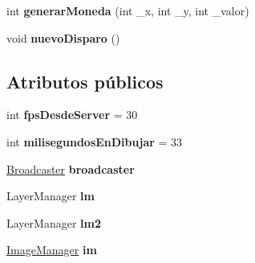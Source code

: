 \begin{DoxyCompactItemize}
\item 
\hypertarget{classBatallaEspacial_1_1Juego_af03e6beac3e3f78e21d41c43a7137296}{
int {\bfseries generarMoneda} (int \_\-x, int \_\-y, int \_\-valor)}
\label{classBatallaEspacial_1_1Juego_af03e6beac3e3f78e21d41c43a7137296}

\item 
\hypertarget{classBatallaEspacial_1_1Juego_ab76f9af23024a4f491d0dc5ec602e8a8}{
void {\bfseries nuevoDisparo} ()}
\label{classBatallaEspacial_1_1Juego_ab76f9af23024a4f491d0dc5ec602e8a8}

\end{DoxyCompactItemize}
\subsection*{Atributos públicos}
\begin{DoxyCompactItemize}
\item 
\hypertarget{classBatallaEspacial_1_1Juego_a377182d34c0423e8f8bf97665bee633f}{
int {\bfseries fpsDesdeServer} = 30}
\label{classBatallaEspacial_1_1Juego_a377182d34c0423e8f8bf97665bee633f}

\item 
\hypertarget{classBatallaEspacial_1_1Juego_a959e754024af44ba431b8f408efc74ef}{
int {\bfseries milisegundosEnDibujar} = 33}
\label{classBatallaEspacial_1_1Juego_a959e754024af44ba431b8f408efc74ef}

\item 
\hypertarget{classBatallaEspacial_1_1Juego_acda7dab731efc8f0d126269ae6edd70e}{
\hyperlink{classBatallaEspacial_1_1Broadcaster}{Broadcaster} {\bfseries broadcaster}}
\label{classBatallaEspacial_1_1Juego_acda7dab731efc8f0d126269ae6edd70e}

\item 
\hypertarget{classBatallaEspacial_1_1Juego_a8ba5b0744fdd2a71aa22b2930a3bd681}{
LayerManager {\bfseries lm}}
\label{classBatallaEspacial_1_1Juego_a8ba5b0744fdd2a71aa22b2930a3bd681}

\item 
\hypertarget{classBatallaEspacial_1_1Juego_a58cd24bc39c5d8fd22b9c7cb016268c8}{
LayerManager {\bfseries lm2}}
\label{classBatallaEspacial_1_1Juego_a58cd24bc39c5d8fd22b9c7cb016268c8}

\item 
\hypertarget{classBatallaEspacial_1_1Juego_aa26c9dcd8431dcde6225015825a77b9f}{
\hyperlink{classBatallaEspacial_1_1ImageManager}{ImageManager} {\bfseries im}}
\label{classBatallaEspacial_1_1Juego_aa26c9dcd8431dcde6225015825a77b9f}


\end{DoxyCompactItemize}
